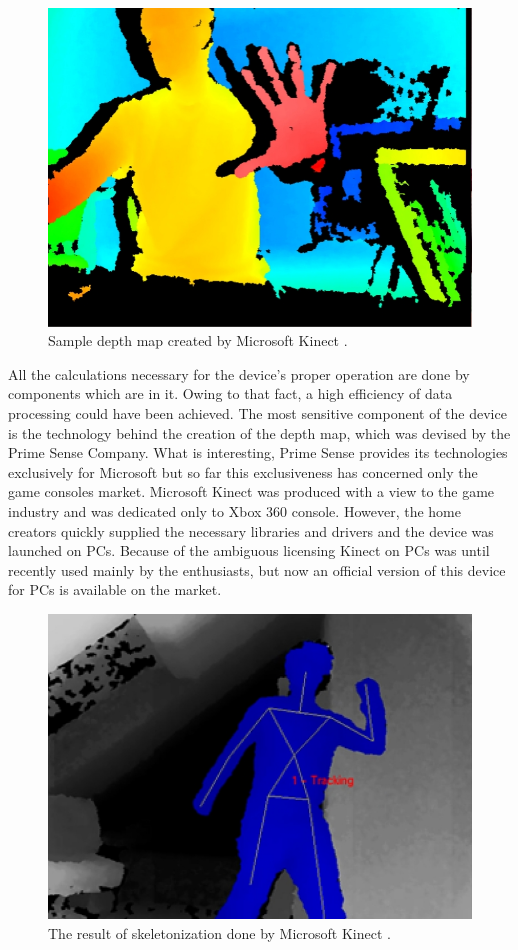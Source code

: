 \documentclass{jacsart}
\begin{document}
\begin{figure}[!t]
\includegraphics[width=0.9\linewidth]{./kinectDepthImage}
\caption{Sample depth map created by Microsoft Kinect \cite{Jr2011}.}
\label{fig:kinectDepth}
\end{figure} 

\indent All the calculations necessary for the device’s proper operation are done by components which are in it. Owing to that fact, a high efficiency of data processing could have been achieved. The most sensitive component of the device is the technology behind the creation of the depth map, which was devised by the Prime Sense Company. What is interesting, Prime Sense provides its technologies exclusively for Microsoft but so far this exclusiveness has concerned only the game consoles market. Microsoft Kinect was produced with a view to the game industry and was dedicated only to Xbox 360 console. However, the home creators quickly supplied the necessary libraries and drivers and the device was launched on PCs. Because of the ambiguous licensing Kinect on PCs was until recently used mainly by the enthusiasts, but now an official version of this device for PCs is available on the market.\\

 \begin{figure}[!t]
 \includegraphics[width=0.9\linewidth]{./kinectSkeleton}
 \caption{The result of skeletonization done by Microsoft Kinect \cite{Jr2011}.}
 \label{fig:kinectSkeleton}
 \end{figure}
\end{document}
